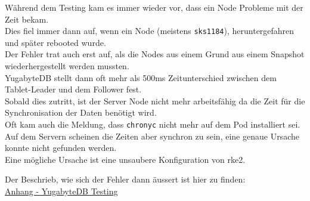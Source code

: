 \begin{flushleft}
    Während dem Testing kam es immer wieder vor, dass ein Node Probleme mit der Zeit bekam.\\
    Dies fiel immer dann auf, wenn ein Node (meistens \texttt{sks1184}), heruntergefahren und später rebooted wurde.\\
    Der Fehler trat auch erst auf, als die Nodes aus einem Grund aus einem Snapshot wiederhergestellt werden mussten.\\
    YugabyteDB stellt dann oft mehr als 500ms Zeitunterschied zwischen dem Tablet-Leader und dem Follower fest.\\
    Sobald dies zutritt, ist der Server Node nicht mehr arbeitsfähig da die Zeit für die Synchronisation der Daten benötigt wird\cite{BYH9Z3MS}.\\
    Oft kam auch die Meldung, dass \texttt{chronyc} nicht mehr auf dem Pod installiert sei.\\
    Auf dem Servern scheinen die Zeiten aber synchron zu sein, eine genaue Ursache konnte nicht gefunden werden.\\
    Eine mögliche Ursache ist eine unsaubere Konfiguration von \gls{rke2}.
\end{flushleft}
\begin{flushleft}
    Der Beschrieb, wie sich der Fehler dann äussert ist hier zu finden:\\
    \hyperref[subsec:appendix_testing_yugabytedb]{Anhang - YugabyteDB Testing}
\end{flushleft}